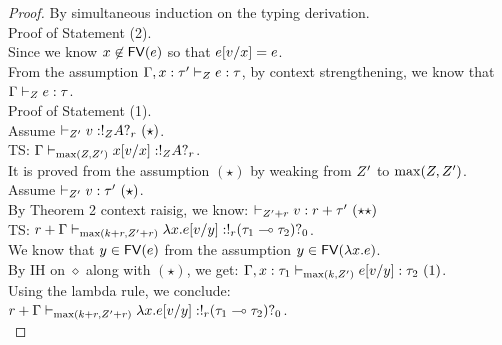 \begin{proof}
  By simultaneous induction on the typing derivation.\\
  Proof of Statement (2).\\
  Since we know $x \not \in \mathsf{FV} (e)$ so that $e[v/x]  =
  e$. \\
  From the assumption $ \Gamma,x : \tau' \vdash_{ Z} e :
  \tau $, by context strengthening,  we know that $   \Gamma  \vdash_{
    Z} e : \tau $.\\

  Proof of Statement (1).\\
  
  Assume  $\empty \tvdash{\nnatA'} \valr : \bang{\nnatA} \ltype \whynot{r}  ~(\star) $.\\
  TS:   $\Gamma \vdash_{\max(Z, Z')} x [v/x]  :
  !_{Z} A ?_{r} $.\\
  It is proved from the assumption $(\star)$ by weaking from $Z'$
  to $\max(Z,Z')$.\\

 

  Assume  $\empty \tvdash{\nnatA'} \valr : \type' ~(\star) $.\\
  By Theorem 2 context raisig, we know: $\empty \tvdash{\nnatA'+r} \valr : r+\type' ~(\star\star) $\\
  TS:   $r+\Gamma \vdash_{\max(k+r, Z'+r)} \lambda x. e [v/y]  :
  !_{r}  ( \tau_1 \multimap \tau_2)?_{0}$.\\
  We know that $y \in \mathsf{FV} (e)$ from the assumption $ y \in \mathsf{FV} (\lambda x.e) $.\\
  By IH on $\diamond$ along with $(\star)$, we get:  $\Gamma,x:\tau_1 \vdash_{\max(k, Z')}  e [v/y]  :
  \tau_2 ~(1)$.\\
  Using the lambda rule, we conclude: \\
  $r+\Gamma \vdash_{\max(k+r, Z'+r)} \lambda x. e [v/y]  :
  !_{r}  ( \tau_1 \multimap \tau_2)?_{0} $.\\


\end{proof}
